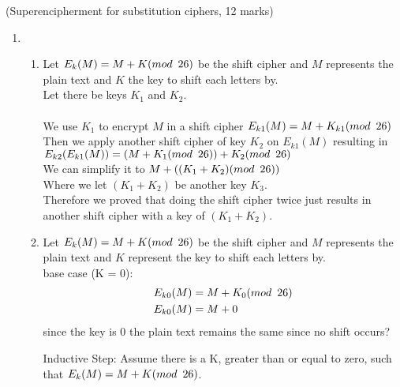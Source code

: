 \documentclass{assignment}
\begin{document}
\begin{problemlist}
\pbitem (Superencipherment for substitution ciphers, 12 marks)
\begin{problem}
\begin{answer}
\begin{enumerate}[label=(\alph*)]
	\item	\begin{enumerate}[label=(\roman*)]
			\item Let $ E_k(M) = M + K (mod \hspace{.5em} 26) $ be the shift cipher and $M$ represents the plain text 
				  and $K$ the key to shift each letters by. \\
				  Let there be keys $K_1$ and $K_2$. \\
				  \\
				  We use $K_1$ to encrypt $M$ in a shift cipher $E_{k1}(M) =  M + K_{k1} (mod \hspace{.5em} 26) $ \\
				  Then we apply another shift cipher of key $K_2$ on $E_{k1}(M)$ resulting in $E_{k2}(E_{k1}(M)) = (M + K_{1} (mod \hspace{.5em} 26)) + K_{2} (mod \hspace{.5em} 26) $ \\
				  We can simplify it to $M + ((K_{1} + K_{2}) (mod \hspace{.5em} 26)) $ \\
				  Where we let $(K_1 + K_2)$ be another key $K_3$. \\
				  Therefore we proved that doing the shift cipher twice just results in another shift cipher with a key of $(K_1 + K_2)$. \\

			
\clearpage				  
				
			\item Let $ E_k(M) = M + K (mod \hspace{.5em} 26) $ be the shift cipher and $M$ represents the plain text 
				  and $K$ represent the key to shift each letters by. \\
				
				base case (K = 0): 
				\begin{align*}
					E_{k0}(M) &= M + K_0  (mod \hspace{.5em} 26) \\
					E_{k0}(M) &= M + 0
				\end{align*}
				since the key is 0 the plain text remains the same since no shift occurs?
				
				Inductive Step:
				Assume there is a K, greater than or equal to zero, such that $ E_k(M) = M + K (mod \hspace{.5em} 26) $.\\
				


\end{enumerate}
\end{enumerate}
\end{answer}
\end{problem}
\end{problemlist}
\end{document}
